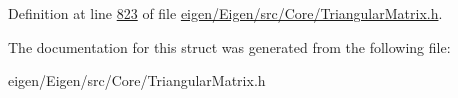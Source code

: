 Definition at line \hyperlink{eigen_2_eigen_2src_2_core_2_triangular_matrix_8h_source_l00823}{823} of file \hyperlink{eigen_2_eigen_2src_2_core_2_triangular_matrix_8h_source}{eigen/\+Eigen/src/\+Core/\+Triangular\+Matrix.\+h}.



The documentation for this struct was generated from the following file\+:\begin{DoxyCompactItemize}
\item 
eigen/\+Eigen/src/\+Core/\+Triangular\+Matrix.\+h\end{DoxyCompactItemize}
